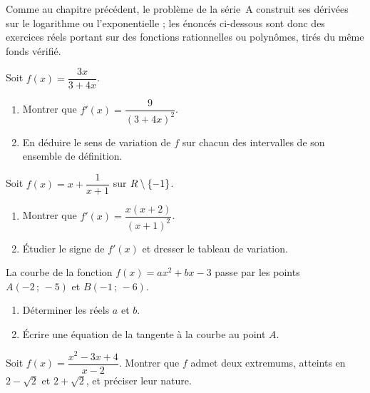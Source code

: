 \begin{annales}
Comme au chapitre précédent, le problème de la série~A construit ses dérivées
sur le logarithme ou l'exponentielle ; les énoncés ci-dessous sont donc des
exercices réels portant sur des fonctions rationnelles ou polynômes, tirés du
même fonds vérifié.

Soit $f(x) = \dfrac{3x}{3+4x}$.
\begin{enumerate}[label=\textbf{\alph*)}, leftmargin=*, itemsep=0.15em]
  \item Montrer que $f'(x) = \dfrac{9}{(3+4x)^{2}}$.
  \item En déduire le sens de variation de $f$ sur chacun des intervalles
        de son ensemble de définition.
\end{enumerate}

Soit $f(x) = x+\dfrac{1}{x+1}$ sur $R\setminus\{-1\}$.
\begin{enumerate}[label=\textbf{\alph*)}, leftmargin=*, itemsep=0.15em]
  \item Montrer que $f'(x) = \dfrac{x(x+2)}{(x+1)^{2}}$.
  \item Étudier le signe de $f'(x)$ et dresser le tableau de variation.
\end{enumerate}

La courbe de la fonction $f(x) = ax^{2}+bx-3$ passe par les points
$A(-2\,;\,-5)$ et $B(-1\,;\,-6)$.
\begin{enumerate}[label=\textbf{\alph*)}, leftmargin=*, itemsep=0.15em]
  \item Déterminer les réels $a$ et $b$.
  \item Écrire une équation de la tangente à la courbe au point $A$.
\end{enumerate}

Soit $f(x) = \dfrac{x^{2}-3x+4}{x-2}$. Montrer que $f$ admet deux extremums,
atteints en $2-\sqrt2$ et $2+\sqrt2$, et préciser leur nature.
\end{annales}

